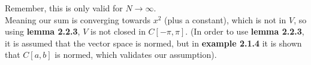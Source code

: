 \documentclass{article}
\begin{document}
Remember, this is only valid for $N \rightarrow \infty$.
\\
Meaning our sum is converging towards $x^2$ (plus a constant), which is not in $V$, so using \textbf{lemma 2.2.3}, $V$ is not closed in $C[-\pi,\pi]$. (In order to use \textbf{lemma 2.2.3}, it is assumed that the vector space is normed, but in \textbf{example 2.1.4} it is shown that $C[a,b]$ is normed, which validates our assumption).
\end{document}
